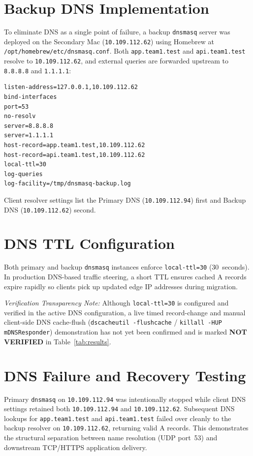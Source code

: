 \documentclass[conference]{IEEEtran}
\begin{document}
\section{Backup DNS Implementation}
To eliminate DNS as a single point of failure, a backup \texttt{dnsmasq} server was deployed on the Secondary Mac (\texttt{10.109.112.62}) using Homebrew at \texttt{/opt/homebrew/etc/dnsmasq.conf}. Both \texttt{app.team1.test} and \texttt{api.team1.test} resolve to \texttt{10.109.112.62}, and external queries are forwarded upstream to \texttt{8.8.8.8} and \texttt{1.1.1.1}:

\begin{lstlisting}[caption={Verified Backup \texttt{dnsmasq} Configuration (\texttt{10.109.112.62})}]
listen-address=127.0.0.1,10.109.112.62
bind-interfaces
port=53
no-resolv
server=8.8.8.8
server=1.1.1.1
host-record=app.team1.test,10.109.112.62
host-record=api.team1.test,10.109.112.62
local-ttl=30
log-queries
log-facility=/tmp/dnsmasq-backup.log
\end{lstlisting}

Client resolver settings list the Primary DNS (\texttt{10.109.112.94}) first and Backup DNS (\texttt{10.109.112.62}) second.

\section{DNS TTL Configuration}
Both primary and backup \texttt{dnsmasq} instances enforce \texttt{local-ttl=30} (30~seconds). In production DNS-based traffic steering, a short TTL ensures cached A records expire rapidly so clients pick up updated edge IP addresses during migration.

\textit{Verification Transparency Note:} Although \texttt{local-ttl=30} is configured and verified in the active DNS configuration, a live timed record-change and manual client-side DNS cache-flush (\texttt{dscacheutil -flushcache} / \texttt{killall -HUP mDNSResponder}) demonstration has not yet been confirmed and is marked \textbf{NOT VERIFIED} in Table~\ref{tab:results}.

\section{DNS Failure and Recovery Testing}
Primary \texttt{dnsmasq} on \texttt{10.109.112.94} was intentionally stopped while client DNS settings retained both \texttt{10.109.112.94} and \texttt{10.109.112.62}. Subsequent DNS lookups for \texttt{app.team1.test} and \texttt{api.team1.test} failed over cleanly to the backup resolver on \texttt{10.109.112.62}, returning valid A records. This demonstrates the structural separation between name resolution (UDP port~53) and downstream TCP/HTTPS application delivery.
\end{document}

